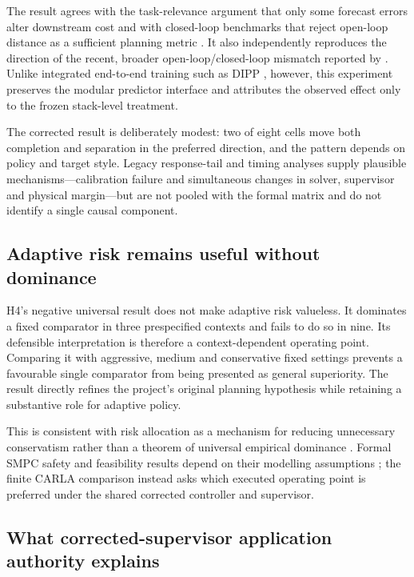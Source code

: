The result agrees with the task-relevance argument that only some forecast
errors alter downstream cost \citep{farid2023task,nakamura2025regret} and with
closed-loop benchmarks that reject open-loop distance as a sufficient planning
metric \citep{caesar2021nuplan}. It also independently reproduces the direction
of the recent, broader open-loop/closed-loop mismatch reported by
\citet{bouzidi2025closing}. Unlike integrated end-to-end training such as DIPP
\citep{huang2023dipp}, however, this experiment preserves the modular predictor
interface and attributes the observed effect only to the frozen stack-level
treatment.

The corrected result is deliberately modest: two of eight cells move both
completion and separation in the preferred direction, and the pattern depends
on policy and target style. Legacy response-tail and timing analyses supply
plausible mechanisms---calibration failure and simultaneous changes in solver,
supervisor and physical margin---but are not pooled with the formal matrix and do not identify
a single causal component.

\subsection{Adaptive risk remains useful without dominance}

H4's negative universal result does not make adaptive risk valueless. It
dominates a fixed comparator in three prespecified contexts and fails to do so
in nine. Its defensible interpretation is therefore a context-dependent
operating point. Comparing it with aggressive, medium and conservative fixed
settings prevents a favourable single comparator from being presented as
general superiority. The result directly refines the project's original
planning hypothesis while retaining a substantive role for adaptive policy.

This is consistent with risk allocation as a mechanism for reducing unnecessary
conservatism rather than a theorem of universal empirical dominance
\citep{ono2008risk,nair2025predictive}. Formal SMPC safety and feasibility
results depend on their modelling assumptions \citep{ren2025recursively}; the
finite CARLA comparison instead asks which executed operating point is preferred
under the shared corrected controller and supervisor.

\subsection{What corrected-supervisor application authority explains}


